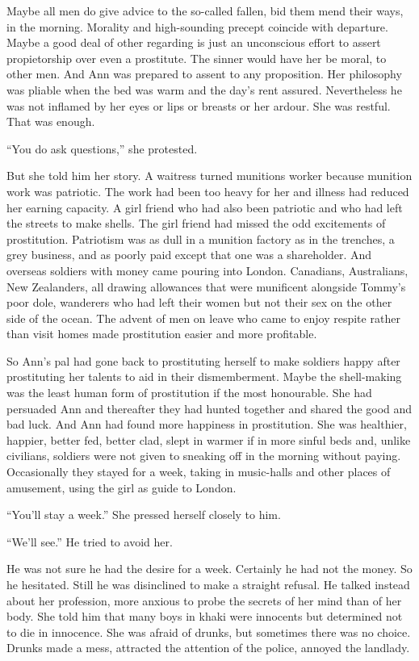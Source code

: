 Maybe all men do give advice to the so-called fallen, bid them mend their ways, in the morning. Morality and high-sounding precept coincide with departure. Maybe a good deal of other regarding is just an unconscious effort to assert propietorship over even a prostitute. The sinner would have her be moral, to other men. And Ann was prepared to assent to any proposition. Her philosophy was pliable when the bed was warm and the day's rent assured. Nevertheless he was not inflamed by her eyes or lips or breasts or her ardour. She was restful. That was enough.

``You do ask questions,'' she protested.

But she told him her story. A waitress turned munitions worker because munition work was patriotic. The work had been too heavy for her and illness had reduced her earning capacity. A girl friend who had also been patriotic and who had left the streets to make shells. The girl friend had missed the odd excitements of prostitution. Patriotism was as dull in a munition factory as in the trenches, a grey business, and as poorly paid except that one was a shareholder. And overseas soldiers with money came pouring into London. Canadians, Australians, New Zealanders, all drawing allowances that were munificent alongside Tommy's poor dole, wanderers who had left their women but not their sex on the other side of the ocean. The advent of men on leave who came to enjoy respite rather than visit homes made prostitution easier and more profitable.

So Ann's pal had gone back to prostituting herself to make soldiers happy after prostituting her talents to aid in their dismemberment. Maybe the shell-making was the least human form of prostitution if the most honourable. She had persuaded Ann and thereafter they had hunted together and shared the good and bad luck. And Ann had found more happiness in prostitution. She was healthier, happier, better fed, better clad, slept in warmer if in more sinful beds and, unlike civilians, soldiers were not given to sneaking off in the morning without paying. Occasionally they stayed for a week, taking in music-halls and other places of amusement, using the girl as guide to London.

``You'll stay a week.'' She pressed herself closely to him.

``We'll see.'' He tried to avoid her.

He was not sure he had the desire for a week. Certainly he had not the money. So he hesitated. Still he was disinclined to make a straight refusal. He talked instead about her profession, more anxious to probe the secrets of her mind than of her body. She told him that many boys in khaki were innocents but determined not to die in innocence. She was afraid of drunks, but sometimes there was no choice. Drunks made a mess, attracted the attention of the police, annoyed the landlady.

